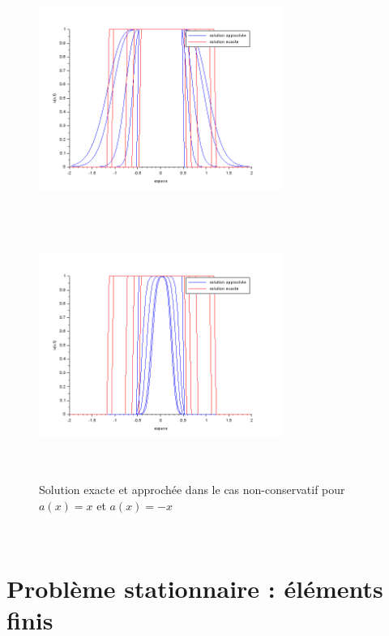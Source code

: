 \documentclass[a4paper,12pt]{article}
\begin{document}
\begin{figure}[h!]
\begin{center}
	\includegraphics[width=225pt,height=225pt]{image/figure_4}
	\includegraphics[width=225pt,height=225pt]{image/figure_5}
\end{center}
\caption{Solution exacte et approch\'ee dans le cas non-conservatif pour $a(x)=x$ et $a(x)=-x$}
\label{Solution exacte et approch\'ee dans le cas non-conservatif pour $a(x)=x$ et $a(x)=-x$}
\end{figure}

~
\newpage
~

\section{Probl\`eme stationnaire : \'el\'ements finis}
\end{document}
